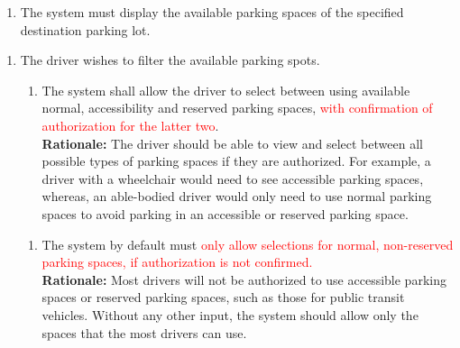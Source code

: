 \documentclass[12pt,letterpaper]{article}
\newcounter{businesseventnum}
\newcounter{funcreqnum}
\begin{document}
\begin{enumerate}[{BE}\thebusinesseventnum.]
\begin{enumerate}[{FR}\thefuncreqnum.]
\end{enumerate}
\begin{enumerate}[{FR}\thefuncreqnum.] 
    \item The system must display the available parking spaces of the specified
    destination parking lot.
\end{enumerate}
\end{enumerate}

\begin{enumerate}[{BE}\thebusinesseventnum.] 
\item The driver wishes to filter the available parking spots.
\begin{enumerate}[{FR}\thefuncreqnum.] 
    \item The system shall allow the driver to select between using available
    normal, accessibility and reserved parking spaces, \textcolor{red}{with
    confirmation of authorization for the latter two}.\\
    \textbf{Rationale:} The driver should be able to view and select between all
    possible types of parking spaces if they are authorized. For example, a
    driver with a wheelchair would need to see accessible parking spaces,
    whereas, an able-bodied driver would only need to use normal parking spaces
    to avoid parking in an accessible or reserved parking space.
\end{enumerate}
\begin{enumerate}[{FR}\thefuncreqnum.] 
    \item The system by default must \textcolor{red}{only allow selections for
    normal, non-reserved parking spaces, if authorization is not
    confirmed.}\\%
    \textbf{Rationale:} Most drivers will not be authorized to use accessible
    parking spaces or reserved parking spaces, such as those for public transit
    vehicles. Without any other input, the system should allow only the spaces
    that the most drivers can use.
\end{enumerate}
\end{enumerate}
\end{document}
